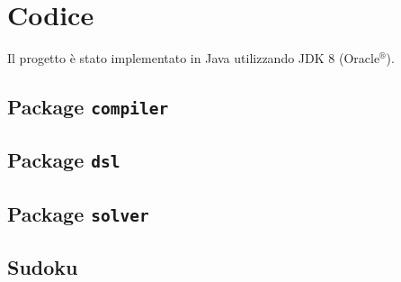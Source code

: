 \section{Codice}

Il progetto è stato implementato in Java\texttrademark{} utilizzando JDK 8 (Oracle$^{\text{®}}$).

\subsection{Package {\tt compiler}}






\subsection{Package {\tt dsl}}








\subsection{Package {\tt solver}}




\subsection{Sudoku}


